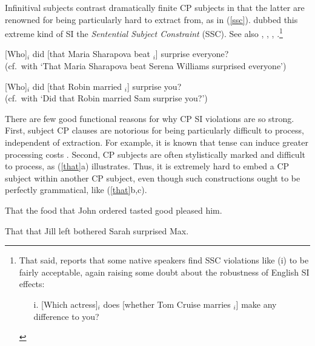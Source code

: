 \documentclass[output=paper]{langsci/langscibook}
\begin{document}
\z \label{vpsi}
\z




\noindent
Infinitival subjects contrast dramatically  finite CP subjects in that the 
latter are renowned for being particularly hard to extract from,  as in  (\ref{ssc}).
  \citet{Ross67} dubbed this extreme kind of SI the  {\it Sentential Subject Constraint} (SSC). See also  \citet{chomsky73}, \citet{huang82},  \citet{chomsky86}, \citet{freidin92}.\footnote{That said, \citet{chavessubj} reports that some native speakers find SSC violations like  (i) to be fairly acceptable, again raising some doubt about the robustness of English SI effects:

\begin{itemize}
\item[i.] [Which actress]$_i$ does [whether Tom Cruise marries \spc$_i$] make any difference to you?
\end{itemize}
}


\ea
\ea \bad{*}[Who]$_i$ did [that Maria Sharapova beat \spc$_i$] surprise everyone?\\
(cf.\ with `That Maria Sharapova beat Serena Williams surprised everyone')

\ex \bad{*}[Who]$_i$ did [that Robin married \spc$_i$] surprise you?\\
(cf.\ with `Did that Robin married Sam surprise you?')
\z \label{ssc}
\z

%



There are  few good functional reasons for why CP SI violations are so strong. First, subject CP clauses are notorious for being particularly difficult to process, independent of extraction. For example, it is known that tense can induce greater processing costs
 \citep{kluender92,gibson0000}. Second, CP  subjects  are often  stylistically marked and difficult  to process,   as  (\ref{that}a) illustrates. Thus, it is extremely hard to embed a CP subject within another CP subject, even though such constructions ought to be perfectly grammatical,  like (\ref{that}b,c). 

\ea
\ea That the food that John ordered tasted good pleased him.\\
\citep{cowper76,gibson91}

\ex \bad{*}That that Jill left bothered Sarah surprised Max.\\
\citep{kimball}
 
\end{document}
